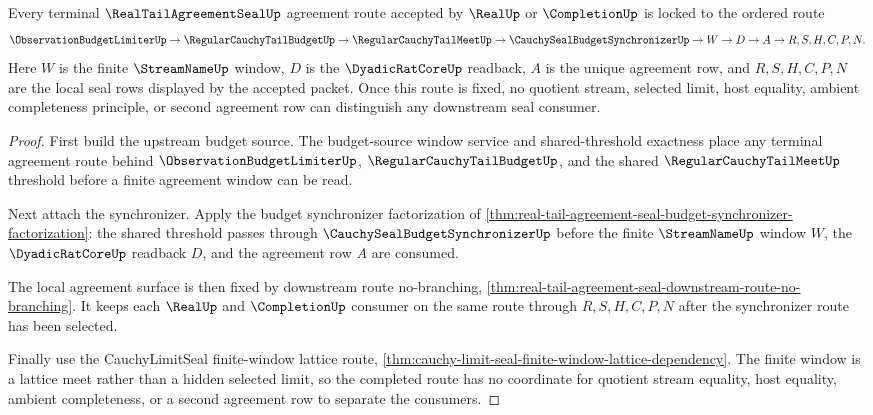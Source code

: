 \begin{theorem}
\label{thm:real-tail-agreement-seal-regular-tailmeet-budget-lock}
Every terminal $\RealTailAgreementSealUp$ agreement route accepted by $\RealUp$ or $\CompletionUp$ is locked to the ordered route
$$
\ObservationBudgetLimiterUp \to \RegularCauchyTailBudgetUp \to \RegularCauchyTailMeetUp \to \CauchySealBudgetSynchronizerUp \to W \to D \to A \to R,S,H,C,P,N.
$$
Here $W$ is the finite $\StreamNameUp$ window, $D$ is the $\DyadicRatCoreUp$ readback, $A$ is the unique agreement row, and $R,S,H,C,P,N$ are the local seal rows displayed by the accepted packet. Once this route is fixed, no quotient stream, selected limit, host equality, ambient completeness principle, or second agreement row can distinguish any downstream seal consumer.
\end{theorem}
\begin{proof}
First build the upstream budget source. The budget-source window service and shared-threshold exactness place any terminal agreement route behind $\ObservationBudgetLimiterUp$, $\RegularCauchyTailBudgetUp$, and the shared $\RegularCauchyTailMeetUp$ threshold before a finite agreement window can be read.

Next attach the synchronizer. Apply the budget synchronizer factorization of \autoref{thm:real-tail-agreement-seal-budget-synchronizer-factorization}: the shared threshold passes through $\CauchySealBudgetSynchronizerUp$ before the finite $\StreamNameUp$ window $W$, the $\DyadicRatCoreUp$ readback $D$, and the agreement row $A$ are consumed.

The local agreement surface is then fixed by downstream route no-branching, \autoref{thm:real-tail-agreement-seal-downstream-route-no-branching}. It keeps each $\RealUp$ and $\CompletionUp$ consumer on the same route through $R,S,H,C,P,N$ after the synchronizer route has been selected.

Finally use the CauchyLimitSeal finite-window lattice route, \autoref{thm:cauchy-limit-seal-finite-window-lattice-dependency}. The finite window is a lattice meet rather than a hidden selected limit, so the completed route has no coordinate for quotient stream equality, host equality, ambient completeness, or a second agreement row to separate the consumers.
\end{proof}

